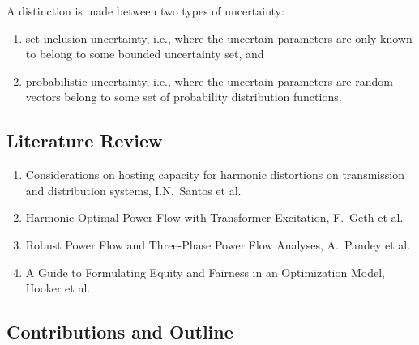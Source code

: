 A distinction is made between two types of uncertainty:
\begin{enumerate}
    \item set inclusion uncertainty, i.e., where the uncertain parameters are only known to belong to some bounded uncertainty set, and
    \item probabilistic uncertainty, i.e., where the uncertain parameters are random vectors belong to some set of probability distribution functions.
\end{enumerate}


\subsection{Literature Review}
\label{sec:literature_review}

\begin{enumerate}
    \item Considerations on hosting capacity for harmonic distortions on transmission and distribution systems, I.N.~Santos et al.
    \item Harmonic Optimal Power Flow with Transformer Excitation, F.~Geth et al. 
    \item Robust Power Flow and Three-Phase Power Flow Analyses, A.~Pandey et al.
    \item A Guide to Formulating Equity and Fairness in an Optimization Model, Hooker et al.
\end{enumerate}

\subsection{Contributions and Outline}
\label{sec:contributions_and_outline}

\newpage